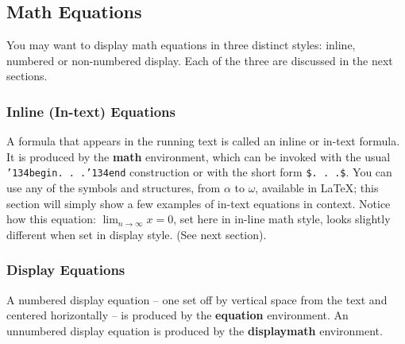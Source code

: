 \documentclass{aamas2012}
\begin{document}
\begin{figure}[width=\linewidth]
\end{figure}
\subsection{Math Equations}
You may want to display math equations in three distinct styles:
inline, numbered or non-numbered display.  Each of
the three are discussed in the next sections.

\subsubsection{Inline (In-text) Equations}
A formula that appears in the running text is called an
inline or in-text formula.  It is produced by the
\textbf{math} environment, which can be
invoked with the usual \texttt{{\char'134}begin. . .{\char'134}end}
construction or with the short form \texttt{\$. . .\$}. You
can use any of the symbols and structures,
from $\alpha$ to $\omega$, available in
\LaTeX\cite{Lamport:LaTeX}; this section will simply show a
few examples of in-text equations in context. Notice how
this equation: \begin{math}\lim_{n\rightarrow \infty}x=0\end{math},
set here in in-line math style, looks slightly different when
set in display style.  (See next section).

\subsubsection{Display Equations}
A numbered display equation -- one set off by vertical space
from the text and centered horizontally -- is produced
by the \textbf{equation} environment. An unnumbered display
equation is produced by the \textbf{displaymath} environment.
\end{document}
